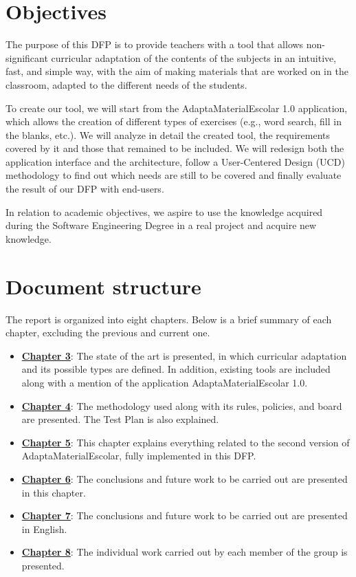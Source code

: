 \section{Objectives}\label{cap:objetives}
The purpose of this DFP is to provide teachers with a tool that allows non-significant curricular adaptation of the contents of the subjects in an intuitive, fast, and simple way, with the aim of making materials that are worked on in the classroom, adapted to the different needs of the students.

To create our tool, we will start from the AdaptaMaterialEscolar 1.0 application, which allows the creation of different types of exercises (e.g., word search, fill in the blanks, etc.). We will analyze in detail the created tool, the requirements covered by it and those that remained to be included. We will redesign both the application interface and the architecture, follow a  User-Centered Design (UCD) methodology to find out which needs are still to be covered and finally evaluate the result of our DFP with end-users.

In relation to academic objectives, we aspire to use the knowledge acquired during the Software Engineering Degree in a real project and acquire new knowledge.

\section{Document structure}\label{cap:Projectstructure}
The report is organized into eight chapters. Below is a brief summary of each chapter, excluding the previous and current one.
\begin{itemize}
\item \textbf{\hyperref[cap:estadoDelArte]{Chapter 3}}: The state of the art is presented, in which curricular adaptation and its possible types are defined. In addition, existing tools are included along with a mention of the application AdaptaMaterialEscolar 1.0.
\item \textbf{\hyperref[cap:metodologia]{Chapter 4}}: The methodology used along with its rules, policies, and board are presented. The Test Plan is also explained.
\item \textbf{\hyperref[cap:AdaptaMaterialEscolar2.0]{Chapter 5}}: This chapter explains everything related to the second version of AdaptaMaterialEscolar, fully implemented in this DFP.
\item \textbf{\hyperref[cap:conclusiones]{Chapter 6}}: The conclusions and future work to be carried out are presented in this chapter.
\item \textbf{\hyperref[cap:conclusions]{Chapter 7}}: The conclusions and future work to be carried out are presented in English.
\item \textbf{\hyperref[cap:TrabajoIndividual]{Chapter 8}}: The individual work carried out by each member of the group is presented.
\end{itemize}